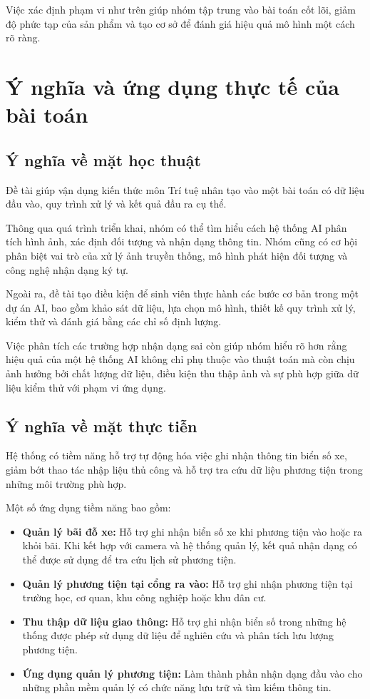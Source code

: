 Việc xác định phạm vi như trên giúp nhóm tập trung vào bài toán cốt lõi, giảm độ phức tạp của sản phẩm và tạo cơ sở để đánh giá hiệu quả mô hình một cách rõ ràng.

\section{Ý nghĩa và ứng dụng thực tế của bài toán}

\subsection{Ý nghĩa về mặt học thuật}

Đề tài giúp vận dụng kiến thức môn Trí tuệ nhân tạo vào một bài toán có dữ liệu đầu vào, quy trình xử lý và kết quả đầu ra cụ thể.

Thông qua quá trình triển khai, nhóm có thể tìm hiểu cách hệ thống AI phân tích hình ảnh, xác định đối tượng và nhận dạng thông tin. Nhóm cũng có cơ hội phân biệt vai trò của xử lý ảnh truyền thống, mô hình phát hiện đối tượng và công nghệ nhận dạng ký tự.

Ngoài ra, đề tài tạo điều kiện để sinh viên thực hành các bước cơ bản trong một dự án AI, bao gồm khảo sát dữ liệu, lựa chọn mô hình, thiết kế quy trình xử lý, kiểm thử và đánh giá bằng các chỉ số định lượng.

Việc phân tích các trường hợp nhận dạng sai còn giúp nhóm hiểu rõ hơn rằng hiệu quả của một hệ thống AI không chỉ phụ thuộc vào thuật toán mà còn chịu ảnh hưởng bởi chất lượng dữ liệu, điều kiện thu thập ảnh và sự phù hợp giữa dữ liệu kiểm thử với phạm vi ứng dụng.

\subsection{Ý nghĩa về mặt thực tiễn}

Hệ thống có tiềm năng hỗ trợ tự động hóa việc ghi nhận thông tin biển số xe, giảm bớt thao tác nhập liệu thủ công và hỗ trợ tra cứu dữ liệu phương tiện trong những môi trường phù hợp.

Một số ứng dụng tiềm năng bao gồm:

\begin{itemize}
  \item \textbf{Quản lý bãi đỗ xe:} Hỗ trợ ghi nhận biển số xe khi phương tiện vào hoặc ra khỏi bãi. Khi kết hợp với camera và hệ thống quản lý, kết quả nhận dạng có thể được sử dụng để tra cứu lịch sử phương tiện.
  \item \textbf{Quản lý phương tiện tại cổng ra vào:} Hỗ trợ ghi nhận phương tiện tại trường học, cơ quan, khu công nghiệp hoặc khu dân cư.
  \item \textbf{Thu thập dữ liệu giao thông:} Hỗ trợ ghi nhận biển số trong những hệ thống được phép sử dụng dữ liệu để nghiên cứu và phân tích lưu lượng phương tiện.
  \item \textbf{Ứng dụng quản lý phương tiện:} Làm thành phần nhận dạng đầu vào cho những phần mềm quản lý có chức năng lưu trữ và tìm kiếm thông tin.
\end{itemize}

